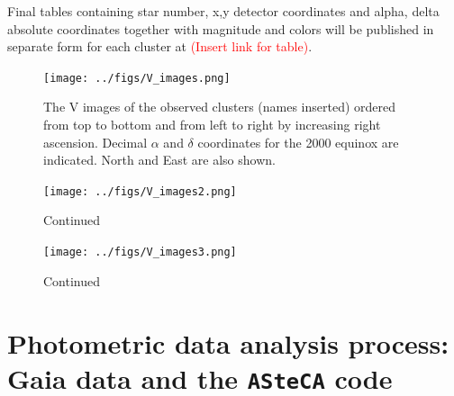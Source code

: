 \documentclass[draft]{aa}
\begin{document}
Final tables containing star number, x,y detector coordinates and alpha,
delta absolute coordinates together with magnitude and colors will be published
in separate form for each cluster at \textcolor{red}{(Insert link for table)}.

\begin{figure}[ht]
    \centering
     \texttt{[image: ../figs/V\_images.png]}   
     \caption{The V images of the observed clusters (names inserted) ordered
     from top to bottom and from left to right by increasing right ascension.
     Decimal $\alpha$ and $\delta$ coordinates for the 2000 equinox are
     indicated. North and East are also shown.}
    \label{fig2}
\end{figure}

\begin{figure}[ht]
    \addtocounter{figure}{-1}
    \centering
    \texttt{[image: ../figs/V\_images2.png]}
    \caption{Continued}
    \label{fig2a}
\end{figure}

\begin{figure}[ht]
    \addtocounter{figure}{-1}
    \centering
    \texttt{[image: ../figs/V\_images3.png]}
    \caption{Continued}
    \label{fig2b}
\end{figure}








\section{Photometric data analysis process: Gaia data and the \texttt{ASteCA}
code}
\label{sec:photom_analysis}
\end{document}

